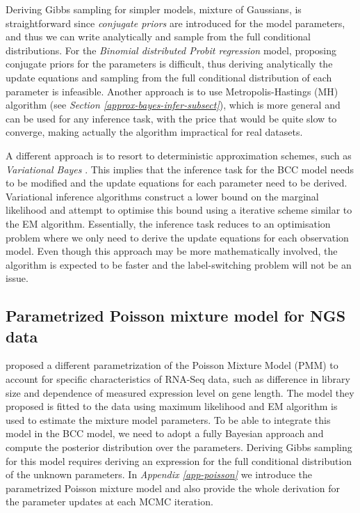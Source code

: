 Deriving Gibbs sampling for simpler models, \eg mixture of Gaussians, is straightforward since \emph{conjugate priors} are introduced for the model parameters, and thus we can write analytically and sample from the full conditional distributions. For the \emph{Binomial distributed Probit regression} model, proposing conjugate priors for the parameters is difficult, thus deriving analytically the update equations and sampling from the full conditional distribution of each parameter is infeasible. Another approach is to use Metropolis-Hastings (MH) algorithm (see \emph{Section \ref{approx-bayes-infer-subsect}}), which is more general and can be used for any inference task, with the price that would be quite slow to converge, making actually the algorithm impractical for real datasets. 

A different approach is to resort to deterministic approximation schemes, such as \emph{Variational Bayes} \citep{Beal2003}. This implies that the inference task for the BCC model needs to be modified and the update equations for each parameter need to be derived. Variational inference algorithms construct a lower bound on the marginal likelihood and attempt to optimise this bound using a iterative scheme similar to the EM algorithm. Essentially, the inference task reduces to an optimisation problem where we only need to derive the update equations for each observation model. Even though this approach may be more mathematically involved, the algorithm is expected to be faster and the label-switching problem \citep{Stephens2000} will not be an issue.


\subsection{Parametrized Poisson mixture model for NGS data}
\citet{Rau2013} proposed a different parametrization of the Poisson Mixture Model (PMM) to account for specific characteristics of RNA-Seq data, such as difference in library size and dependence of measured expression level on gene length. The model they proposed is fitted to the data using maximum likelihood and EM algorithm is used to estimate the mixture model parameters. To be able to integrate this model in the BCC model, we need to adopt a fully Bayesian approach and compute the posterior distribution over the parameters. Deriving Gibbs sampling for this model requires deriving an expression for the full conditional distribution of the unknown parameters. In \emph{Appendix \ref{app-poisson}} we introduce the parametrized Poisson mixture model and also provide the whole derivation for the parameter updates at each MCMC iteration.

